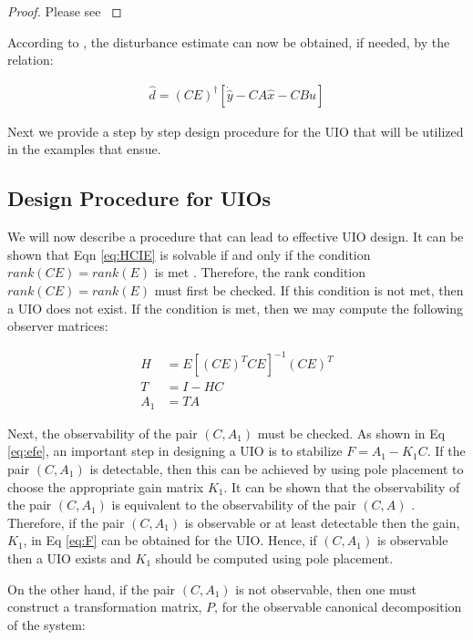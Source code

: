 \documentclass{amsart}
\theoremstyle{definition}
\theoremstyle{remark}
\numberwithin{equation}{section}
\begin{document}
\begin{proof}
Please see \cite{Chen99}
\end{proof}
According to \cite{Shaf2015}, the disturbance estimate can now be obtained, if needed, by the relation:

\begin{equation}
\begin{aligned}
\hat{d} = (CE)^{\dagger}[\dot{\hat{y}}-CA\hat{x}-CBu]
\end{aligned}
\end{equation}

Next we provide a step by step design procedure for the UIO that will be utilized in the examples that ensue. 
\subsection{Design Procedure for UIOs} 
\label{sec: UIODesign}
 
We will now describe a procedure that can lead to effective UIO design.  It can be shown that Eqn \ref{eq:HCIE} is solvable if and only if the condition $rank(CE) = rank(E)$ is met \cite{Chen99}. Therefore, the rank condition  $rank(CE) = rank(E)$ must first be checked. If this condition is not met, then a UIO does not exist.  If the condition is met, then we may compute the following observer matrices: 

\begin{center}
\begin{align*}
H   &= E[(CE)^T CE]^{-1} (CE)^T\\ 
T   &= I-HC \\
A_1 &= TA
\end{align*}
\end{center}
Next, the observability of the pair $(C,A_1)$ must be checked. As shown in Eq \ref{eq:efe}, an important step in designing a UIO is to stabilize $F=A_1-K_1 C$.  If the pair $(C,A_1)$ is detectable, then this can be achieved by using pole placement to choose the appropriate gain matrix $K_1$.  It can be shown that the observability of the pair $(C,A_1)$ is equivalent to the observability of the pair $(C,A)$ \cite{Sch12}. Therefore, if the pair $(C,A_1)$ is observable or at least detectable then the gain, $K_1$, in Eq \ref{eq:F} can be obtained for the UIO. Hence, if $(C,A_1)$ is observable then a UIO exists and $K_1$ should be computed using pole placement. 
\vspace{3mm}

On the other hand, if the pair $(C, A_1)$ is not observable, then one must construct a transformation matrix, $P$, for the observable canonical decomposition of the system:
\end{document}

